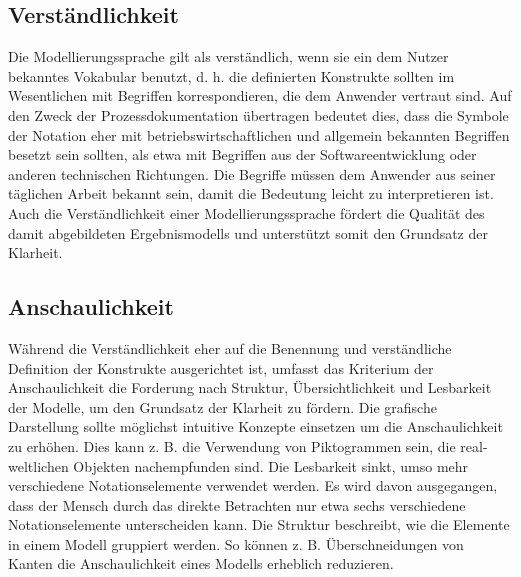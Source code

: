 \subsection{Verständlichkeit}
Die Modellierungssprache gilt als verständlich, wenn sie ein dem Nutzer bekanntes Vokabular benutzt, d. h. die definierten Konstrukte sollten im Wesentlichen mit Begriffen korrespondieren, die dem Anwender vertraut sind. Auf den Zweck der Prozessdokumentation übertragen bedeutet dies, dass die Symbole der Notation eher mit betriebswirtschaftlichen und allgemein bekannten Begriffen besetzt sein sollten, als etwa mit Begriffen aus der Softwareentwicklung oder anderen technischen Richtungen. Die Begriffe müssen dem Anwender aus seiner täglichen Arbeit bekannt sein, damit die Bedeutung leicht zu interpretieren ist. Auch die Verständlichkeit einer Modellierungssprache fördert die Qualität des damit abgebildeten Ergebnismodells und unterstützt somit den Grundsatz der Klarheit.

\subsection{Anschaulichkeit}
Während die Verständlichkeit eher auf die Benennung und verständliche Definition der Konstrukte ausgerichtet ist, umfasst das Kriterium der Anschaulichkeit die Forderung nach Struktur, Übersichtlichkeit und Lesbarkeit der Modelle, um den Grundsatz der Klarheit zu fördern. Die grafische Darstellung sollte möglichst intuitive Konzepte einsetzen um die Anschaulichkeit zu erhöhen. Dies kann z. B. die Verwendung von Piktogrammen sein, die real-weltlichen Objekten nachempfunden sind. Die Lesbarkeit sinkt, umso mehr verschiedene Notationselemente verwendet werden. Es wird davon ausgegangen, dass der Mensch durch das direkte Betrachten nur etwa sechs verschiedene Notationselemente unterscheiden kann. Die Struktur beschreibt, wie die Elemente in einem Modell gruppiert werden. So können z. B. Überschneidungen von Kanten die Anschaulichkeit eines Modells erheblich reduzieren.


